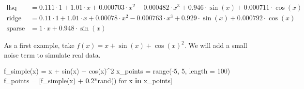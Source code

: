 \documentclass[
]{article}
\newenvironment{Shaded}{\begin{snugshade}}{\end{snugshade}}
\newcommand{\CommentTok}[1]{\textcolor[rgb]{0.37,0.37,0.37}{#1}}
\newcommand{\FloatTok}[1]{\textcolor[rgb]{0.68,0.00,0.00}{#1}}
\newcommand{\FunctionTok}[1]{\textcolor[rgb]{0.28,0.35,0.67}{#1}}
\newcommand{\KeywordTok}[1]{\textcolor[rgb]{0.00,0.23,0.31}{\textbf{#1}}}
\newcommand{\NormalTok}[1]{\textcolor[rgb]{0.00,0.23,0.31}{#1}}
\newcommand{\OperatorTok}[1]{\textcolor[rgb]{0.37,0.37,0.37}{#1}}
\newcommand{\SpecialCharTok}[1]{\textcolor[rgb]{0.37,0.37,0.37}{#1}}
\newcommand{\StringTok}[1]{\textcolor[rgb]{0.13,0.47,0.30}{#1}}
\begin{document}
\begin{Shaded}
\end{Shaded}

\begin{subequations} \label{eq:f-simple-1-sparse} \begin{align}    \mathrm{llsq} &= 0.111 \cdot 1 + 1.01 \cdot x + 0.000703 \cdot x^{2} -0.000482 \cdot x^{3} + 0.946 \cdot \sin\left( x \right) + 0.000711 \cdot \cos\left( x \right) \\
  \mathrm{ridge} &= 0.11 \cdot 1 + 1.01 \cdot x + 0.00078 \cdot x^{2} -0.000763 \cdot x^{3} + 0.929 \cdot \sin\left( x \right) + 0.000792 \cdot \cos\left( x \right) \\
  \mathrm{sparse} &= 1 \cdot x + 0.948 \cdot \sin\left( x \right) \end{align} \end{subequations}

As a first example, take \(f(x) = x + \sin(x) + \cos(x)^2\). We will add
a small noise term to simulate real data.

\begin{Shaded}
\begin{Highlighting}[]
\FunctionTok{f\_simple}\NormalTok{(x) }\OperatorTok{=}\NormalTok{ x }\OperatorTok{+} \FunctionTok{sin}\NormalTok{(x) }\OperatorTok{+} \FunctionTok{cos}\NormalTok{(x)}\OperatorTok{\^{}}\FloatTok{2}
\NormalTok{x\_points }\OperatorTok{=} \FunctionTok{range}\NormalTok{(}\OperatorTok{{-}}\FloatTok{5}\NormalTok{, }\FloatTok{5}\NormalTok{, length }\OperatorTok{=} \FloatTok{100}\NormalTok{)}
\NormalTok{f\_points }\OperatorTok{=}\NormalTok{ [}\FunctionTok{f\_simple}\NormalTok{(x) }\OperatorTok{+} \FloatTok{0.2}\FunctionTok{*rand}\NormalTok{() for x }\KeywordTok{in}\NormalTok{ x\_points]}
\end{Highlighting}
\end{Shaded}
\end{document}
